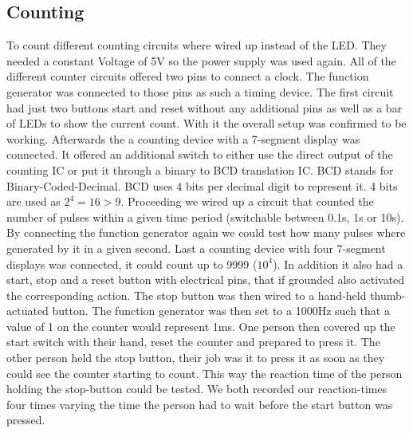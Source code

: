 \documentclass[fleqn,14pt]{article}
\begin{document}
\subsection{Counting}
To count different counting circuits where wired up instead of the LED. They needed a constant Voltage
of 5V so the power supply was used again. All of the different counter circuits offered two pins to connect
a clock. The function generator was connected to those pins as such a timing device. The first circuit had
just two buttons start and reset without any additional pins as well as a bar of LEDs to show the current
count. With it the overall setup was confirmed to be working. 
\newline
\newline
Afterwards the a counting device with a
7-segment display was connected. It offered an additional switch to either use the direct output
of the counting IC or put it through a binary to BCD translation IC. BCD stands for  Binary-Coded-Decimal.
BCD uses 4 bits per decimal digit to represent it. 4 bits are used as $2^4=16 > 9$. 
\newline
\newline
Proceeding we wired up a circuit that counted the number of pulses within a given time period (switchable between
0.1s, 1s or 10s). By connecting the function generator again we could test how many pulses where generated by
it in a given second.
\newline
\newline
Last a counting device with four 7-segment displays was connected, it could count up to 9999 ($10^4$). In
addition it also had a start, stop and a reset button with electrical pins, that if grounded also activated
the corresponding action. The stop button was then wired to a hand-held thumb-actuated button. The function
generator was then set to a 1000Hz such that a value of 1 on the counter would represent 1ms. One person then
covered up the start switch with their hand, reset the counter and prepared to press it. The other person
held the stop button, their job was it to press it as soon as they could see the counter starting to count.
This way the reaction time of the person holding the stop-button could be tested. We both recorded our
reaction-times four times varying the time the person had to wait before the start button was pressed.
\end{document}
